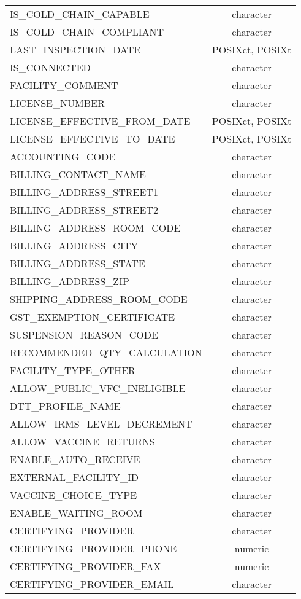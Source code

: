 \documentclass[
  letterpaper,
  DIV=11,
  numbers=noendperiod]{scrreprt}
\begin{document}
\begin{longtable}{lc}
IS\_COLD\_CHAIN\_CAPABLE & character \\ 
IS\_COLD\_CHAIN\_COMPLIANT & character \\ 
LAST\_INSPECTION\_DATE & POSIXct, POSIXt \\ 
IS\_CONNECTED & character \\ 
FACILITY\_COMMENT & character \\ 
LICENSE\_NUMBER & character \\ 
LICENSE\_EFFECTIVE\_FROM\_DATE & POSIXct, POSIXt \\ 
LICENSE\_EFFECTIVE\_TO\_DATE & POSIXct, POSIXt \\ 
ACCOUNTING\_CODE & character \\ 
BILLING\_CONTACT\_NAME & character \\ 
BILLING\_ADDRESS\_STREET1 & character \\ 
BILLING\_ADDRESS\_STREET2 & character \\ 
BILLING\_ADDRESS\_ROOM\_CODE & character \\ 
BILLING\_ADDRESS\_CITY & character \\ 
BILLING\_ADDRESS\_STATE & character \\ 
BILLING\_ADDRESS\_ZIP & character \\ 
SHIPPING\_ADDRESS\_ROOM\_CODE & character \\ 
GST\_EXEMPTION\_CERTIFICATE & character \\ 
SUSPENSION\_REASON\_CODE & character \\ 
RECOMMENDED\_QTY\_CALCULATION & character \\ 
FACILITY\_TYPE\_OTHER & character \\ 
ALLOW\_PUBLIC\_VFC\_INELIGIBLE & character \\ 
DTT\_PROFILE\_NAME & character \\ 
ALLOW\_IRMS\_LEVEL\_DECREMENT & character \\ 
ALLOW\_VACCINE\_RETURNS & character \\ 
ENABLE\_AUTO\_RECEIVE & character \\ 
EXTERNAL\_FACILITY\_ID & character \\ 
VACCINE\_CHOICE\_TYPE & character \\ 
ENABLE\_WAITING\_ROOM & character \\ 
CERTIFYING\_PROVIDER & character \\ 
CERTIFYING\_PROVIDER\_PHONE & numeric \\ 
CERTIFYING\_PROVIDER\_FAX & numeric \\ 
CERTIFYING\_PROVIDER\_EMAIL & character \\ 

\end{longtable}
\end{document}
